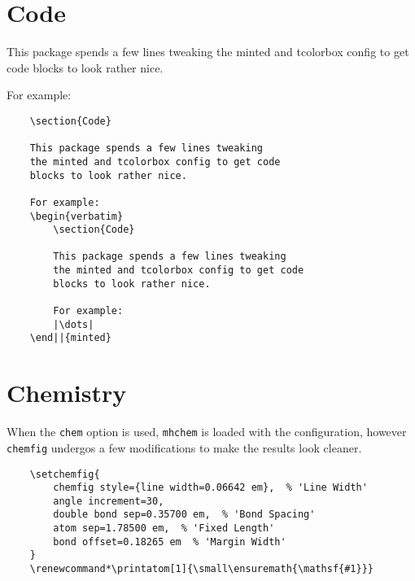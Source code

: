 \documentclass[solid,math,chem,code,plot,gloss]{bmc}
\begin{document}
\section{Code}

This package spends a few lines tweaking
the minted and tcolorbox config to get code
blocks to look rather nice.

For example:
\begin{verbatim}
    \section{Code}

    This package spends a few lines tweaking
    the minted and tcolorbox config to get code
    blocks to look rather nice.

    For example:
    \begin{verbatim}
        \section{Code}

        This package spends a few lines tweaking
        the minted and tcolorbox config to get code
        blocks to look rather nice.

        For example:
        |\dots|
    \end||{minted}
\end{verbatim}

\section{Chemistry}
When the \texttt{chem} option is used, \texttt{mhchem}
is loaded with the configuration, however \texttt{chemfig}
undergos a few modifications to make the results look cleaner.

\begin{center}
    \qquad
\end{center}

\begin{verbatim}
	\setchemfig{
		chemfig style={line width=0.06642 em},  % 'Line Width'
		angle increment=30,
		double bond sep=0.35700 em,  % 'Bond Spacing'
		atom sep=1.78500 em,  % 'Fixed Length'
		bond offset=0.18265 em  % 'Margin Width'
	}
	\renewcommand*\printatom[1]{\small\ensuremath{\mathsf{#1}}}
\end{verbatim}
\end{document}
